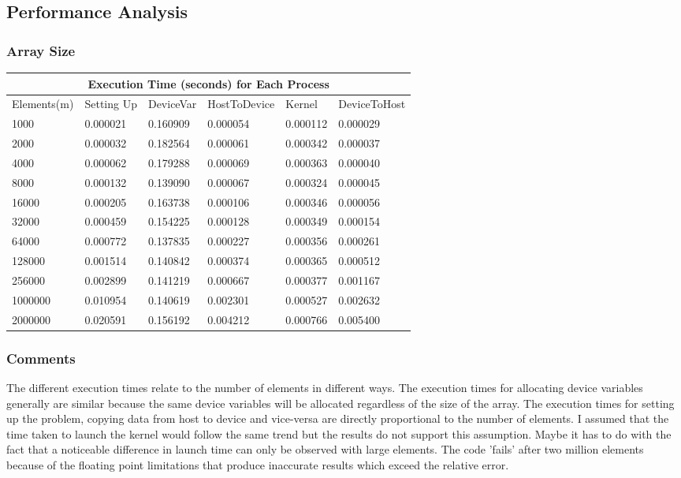 \documentclass{article}
\begin{document}
\subsection{Performance Analysis}
 \subsubsection{Array Size} 
 \setlength{\parindent}{1cm}
 \begin{tabular}{ |p{2.5cm}||p{2cm}|p{2cm}|p{2cm}|p{2cm}|p{2cm}|  }
 \hline
 \multicolumn{6}{|c|}{Execution Time (seconds) for Each Process } \\
 \hline
Elements(m) & Setting Up & DeviceVar & HostToDevice & Kernel & DeviceToHost\\
 \hline
 1000 & 0.000021 & 0.160909 & 0.000054 & 0.000112 & 0.000029\\
 \hline
 2000 & 0.000032 & 0.182564 & 0.000061 & 0.000342 & 0.000037\\
 \hline
 4000 & 0.000062 & 0.179288 & 0.000069 & 0.000363 & 0.000040\\
 \hline
 8000 & 0.000132 & 0.139090 & 0.000067 & 0.000324 & 0.000045\\
 \hline
 16000 & 0.000205 & 0.163738 & 0.000106 & 0.000346 & 0.000056\\
 \hline
 32000 & 0.000459 & 0.154225 & 0.000128 & 0.000349 & 0.000154\\
 \hline
 64000 & 0.000772 & 0.137835 & 0.000227 & 0.000356 & 0.000261\\
 \hline
 128000 & 0.001514 & 0.140842 & 0.000374 & 0.000365 & 0.000512\\
 \hline 
 256000 & 0.002899 & 0.141219 & 0.000667 & 0.000377 & 0.001167\\
 \hline 
 1000000 & 0.010954 & 0.140619 & 0.002301 & 0.000527 & 0.002632\\
 \hline
 2000000 & 0.020591 & 0.156192 & 0.004212 & 0.000766 & 0.005400\\
 \hline
 \end{tabular}

\subsubsection{Comments} 
 The different execution times relate to the number of elements in different ways. The execution times for allocating device variables generally are similar because the same device variables will be allocated regardless of the size of the array. The execution times for setting up the problem, copying data from host to device and vice-versa are directly proportional to the number of elements. I assumed that the time taken to launch the kernel would follow the same trend but the results do not support this assumption. Maybe it has to do with the fact that a noticeable difference in launch time can only be observed with large elements. The code 'fails' after two million elements because of the floating point limitations that produce inaccurate results which exceed the relative error.
\end{document}
